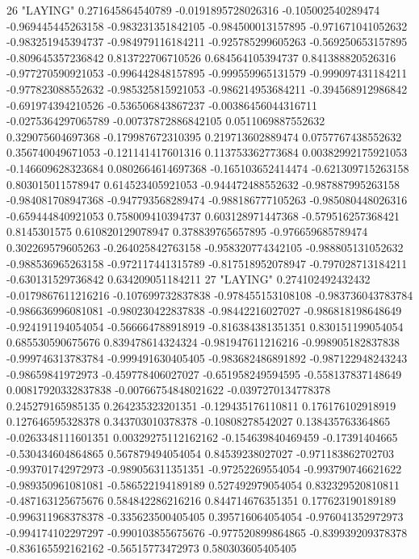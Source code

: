 26 "LAYING" 0.271645864540789 -0.0191895728026316 -0.105002540289474 -0.969445445263158 -0.983231351842105 -0.984500013157895 -0.971671041052632 -0.983251945394737 -0.984979116184211 -0.925785299605263 -0.569250653157895 -0.809645357236842 0.813722706710526 0.684564105394737 0.841388820526316 -0.977270590921053 -0.996442848157895 -0.999559965131579 -0.999097431184211 -0.977823088552632 -0.985325815921053 -0.986214953684211 -0.394568912986842 -0.691974394210526 -0.536506843867237 -0.00386456044316711 -0.0275364297065789 -0.00737872886842105 0.0511069887552632 0.329075604697368 -0.179987672310395 0.219713602889474 0.0757767438552632 0.356740049671053 -0.121141417601316 0.113753362773684 0.00382992175921053 -0.146609628323684 0.0802664614697368 -0.165103652414474 -0.621309715263158 0.803015011578947 0.614523405921053 -0.944472488552632 -0.987887995263158 -0.984081708947368 -0.947793568289474 -0.988186777105263 -0.985080448026316 -0.659444840921053 0.758009410394737 0.603128971447368 -0.579516257368421 0.8145301575 0.610820129078947 0.378839765657895 -0.976659685789474 0.302269579605263 -0.264025842763158 -0.958320774342105 -0.988805131052632 -0.988536965263158 -0.972117441315789 -0.817518952078947 -0.797028713184211 -0.630131529736842 0.634209051184211
27 "LAYING" 0.274102492432432 -0.0179867611216216 -0.107699732837838 -0.978455153108108 -0.983736043783784 -0.986636996081081 -0.980230422837838 -0.98442216027027 -0.986818198648649 -0.924191194054054 -0.566664788918919 -0.816384381351351 0.830151199054054 0.685530590675676 0.839478614324324 -0.981947611216216 -0.998905182837838 -0.999746313783784 -0.999491630405405 -0.983682486891892 -0.987122948243243 -0.98659841972973 -0.459778406027027 -0.651958249594595 -0.558137837148649 0.00817920332837838 -0.00766754848021622 -0.0397270134778378 0.245279165985135 0.264235323201351 -0.129435176110811 0.176176102918919 0.127646595328378 0.343703010378378 -0.10808278542027 0.138435763364865 -0.0263348111601351 0.00329275112162162 -0.154639840469459 -0.17391404665 -0.530434604864865 0.567879494054054 0.84539238027027 -0.971183862702703 -0.993701742972973 -0.989056311351351 -0.97252269554054 -0.993790746621622 -0.989350961081081 -0.586522194189189 0.527492979054054 0.832329520810811 -0.487163125675676 0.584842286216216 0.844714676351351 0.177623190189189 -0.996311968378378 -0.335623500405405 0.395716064054054 -0.976041352972973 -0.994174102297297 -0.990103855675676 -0.977520899864865 -0.839939209378378 -0.836165592162162 -0.56515773472973 0.580303605405405
